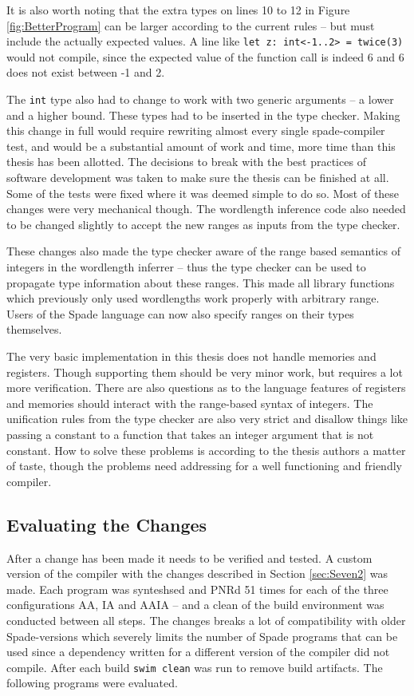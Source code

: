 It is also worth noting that the extra types on lines 10 to 12 in Figure \ref{fig:BetterProgram} can be larger according to the current rules -- but must include the actually expected values. A line like \verb+let z: int<-1..2> = twice(3)+ would not compile, since the expected value of the function call is indeed 6 and 6 does not exist between -1 and 2.

The \verb+int+ type also had to change to work with two generic arguments -- a lower and a higher bound. These types had to be inserted in the type checker. Making this change in full would require rewriting almost every single spade-compiler test, and would be a substantial amount of work and time, more time than this thesis has been allotted. The decisions to break with the best practices of software development was taken to make sure the thesis can be finished at all. Some of the tests were fixed where it was deemed simple to do so. Most of these changes were very mechanical though. The wordlength inference code also needed to be changed slightly to accept the new ranges as inputs from the type checker.

These changes also made the type checker aware of the range based semantics of integers in the wordlength inferrer -- thus the type checker can be used to propagate type information about these ranges. This made all library functions which previously only used wordlengths work properly with arbitrary range. Users of the Spade language can now also specify ranges on their types themselves.

The very basic implementation in this thesis does not handle memories and registers. Though supporting them should be very minor work, but requires a lot more verification. There are also questions as to the language features of registers and memories should interact with the range-based syntax of integers. The unification rules from the type checker are also very strict and disallow things like passing a constant to a function that takes an integer argument that is not constant. How to solve these problems is according to the thesis authors a matter of taste, though the problems need addressing for a well functioning and friendly compiler.

\subsection{Evaluating the Changes}
After a change has been made it needs to be verified and tested. A custom version of the compiler with the changes described in Section \ref{sec:Seven2} was made. Each program was synteshsed and PNRd 51 times for each of the three configurations AA, IA and AAIA -- and a clean of the build environment was conducted between all steps. The changes breaks a lot of compatibility with older Spade-versions which severely limits the number of Spade programs that can be used since a dependency written for a different version of the compiler did not compile. After each build \verb+swim clean+ was run to remove build artifacts. The following programs were evaluated. 

